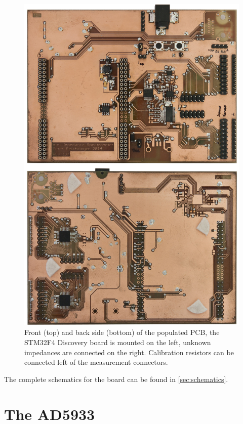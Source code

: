 \begin{figure}[htpb]
  \centering
    \includegraphics[width=\textwidth]{bilder/pcb_frontback.jpg}
  \caption{Front (top) and back side (bottom) of the populated PCB, the STM32F4 Discovery board is mounted on the left,
    unknown impedances are connected on the right. Calibration resistors can be connected left of the measurement
    connectors.}
  \label{fig:pcb_frontback}
\end{figure}

The complete schematics for the board can be found in \autoref{sec:schematics}.


\section{The AD5933}

